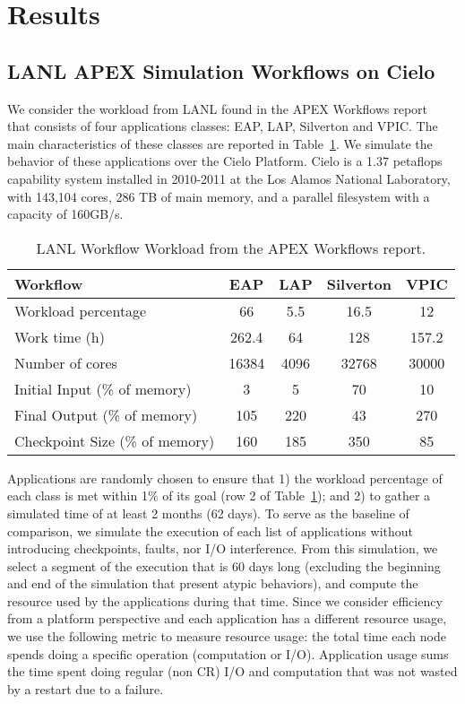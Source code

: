 
\section{Results}\label{sec:results}

\subsection{LANL APEX Simulation Workflows on Cielo}

We consider the workload from LANL found in the APEX Workflows
report~\cite{apex2016} that consists of four applications
classes: EAP, LAP, Silverton and VPIC. The main characteristics of
these classes are reported in Table~\ref{table:lanl}. We simulate the
behavior of these applications over the Cielo Platform. Cielo is a
1.37 petaflops capability system installed in 2010-2011 at the Los
Alamos National Laboratory, with 143,104 cores, 286 TB of main memory,
and a parallel filesystem with a capacity of 160GB/s.

\begin{table}
\begin{tabular}{|l|c|c|c|c|}
\hline
 Workflow & EAP & LAP & Silverton & VPIC \\\hline
Workload percentage & 66 & 5.5 & 16.5 & 12 \\\hline
Work time (h) & 262.4 & 64 & 128 & 157.2 \\\hline
Number of cores & 16384 & 4096 & 32768 & 30000 \\\hline
Initial Input (\% of memory) &  3 & 5 & 70 & 10 \\\hline
Final Output (\% of memory) & 105 & 220 & 43 & 270 \\\hline
Checkpoint Size (\% of memory) & 160 & 185 & 350 & 85 \\\hline
\end{tabular}
\caption{LANL Workflow Workload from the APEX Workflows report.\label{table:lanl}}
\end{table}

Applications are randomly chosen to ensure that 1) the workload
percentage of each class is met within 1\% of its goal (row 2 of 
Table~\ref{table:lanl}); and 2) to
gather a simulated time of at least 2 months (62 days). To serve as
the baseline of comparison, we simulate the execution of each list of
applications without introducing checkpoints, faults, nor I/O
interference. From this simulation, we select a segment of the
execution that is 60 days long (excluding the beginning and end of the
simulation that present atypic behaviors), and compute the
resource used by the applications during that time. Since we consider
efficiency from a platform perspective and each application has a
different resource usage, we use the following metric to measure
resource usage: the total time each node spends doing a specific
operation (computation or I/O). Application usage sums the time spent
doing regular (non CR) I/O and computation that was not wasted by a
restart due to a failure.

